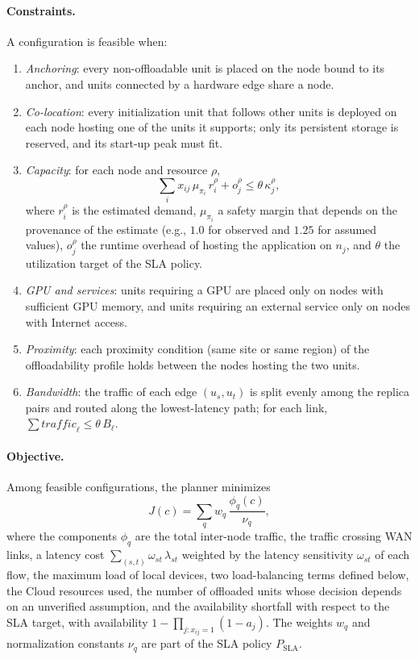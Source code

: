 \paragraph{Constraints.}
A configuration is feasible when:
\begin{enumerate}
\item \emph{Anchoring}: every non-offloadable unit is placed on the node bound
to its anchor, and units connected by a hardware edge share a node.
\item \emph{Co-location}: every initialization unit that follows other units
is deployed on each node hosting one of the units it supports; only its
persistent storage is reserved, and its start-up peak must fit.
\item \emph{Capacity}: for each node and resource $\rho$,
\begin{equation}
\sum_i x_{ij}\, \mu_{\pi_i}\, r_i^{\rho} + o_j^{\rho} \le \theta\, \kappa_j^{\rho},
\end{equation}
where $r_i^{\rho}$ is the estimated demand, $\mu_{\pi_i}$ a safety margin that
depends on the provenance of the estimate (e.g., $1.0$ for observed and
$1.25$ for assumed values), $o_j^{\rho}$ the runtime overhead of hosting the
application on $n_j$, and $\theta$ the utilization target of the SLA policy.
\item \emph{GPU and services}: units requiring a GPU are placed only on nodes
with sufficient GPU memory, and units requiring an external service only on
nodes with Internet access.
\item \emph{Proximity}: each proximity condition (same site or same region) of
the offloadability profile holds between the nodes hosting the two units.
\item \emph{Bandwidth}: the traffic of each edge $(u_s,u_t)$ is split evenly
among the replica pairs and routed along the lowest-latency path; for each
link, $\sum \mathit{traffic}_\ell \le \theta\, B_\ell$.
\end{enumerate}

\paragraph{Objective.}
Among feasible configurations, the planner minimizes
\begin{equation}
J(c)=\sum_{q} w_q \,\frac{\phi_q(c)}{\nu_q},
\end{equation}
where the components $\phi_q$ are the total inter-node traffic, the traffic
crossing WAN links, a latency cost $\sum_{(s,t)} \omega_{st}\,\lambda_{st}$
weighted by the latency sensitivity $\omega_{st}$ of each flow, the maximum
load of local devices, two load-balancing terms defined below, the
Cloud resources used, the number of offloaded units whose decision depends on
an unverified assumption, and the availability shortfall with respect to the
SLA target, with availability $1-\prod_{j:x_{ij}=1}(1-a_j)$. The weights $w_q$
and normalization constants $\nu_q$ are part of the SLA policy
$P_{\mathrm{SLA}}$.

